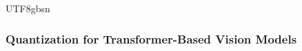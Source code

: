 \documentclass[10pt,journal,compsoc]{IEEEtran}
\newcommand{\<}{\left\langle}
\renewcommand{\>}{\right\rangle}
\newcommand{\1}{\mathbbm{1}}
\begin{document}
\begin{CJK}{UTF8}{gbsn}


\subsubsection{Quantization for Transformer-Based Vision Models}


\end{CJK}
\end{document}
